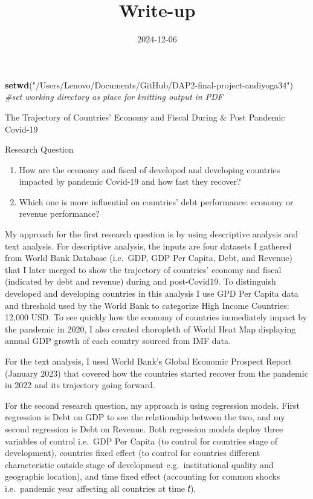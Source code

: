 \documentclass[
]{article}
\title{Write-up}
\author{}
\date{\vspace{-2.5em}2024-12-06}
\newenvironment{Shaded}{\begin{snugshade}}{\end{snugshade}}
\newcommand{\CommentTok}[1]{\textcolor[rgb]{0.56,0.35,0.01}{\textit{#1}}}
\newcommand{\FunctionTok}[1]{\textcolor[rgb]{0.13,0.29,0.53}{\textbf{#1}}}
\newcommand{\NormalTok}[1]{#1}
\newcommand{\StringTok}[1]{\textcolor[rgb]{0.31,0.60,0.02}{#1}}
\begin{document}
\maketitle

\begin{Shaded}
\begin{Highlighting}[]
\FunctionTok{setwd}\NormalTok{(}\StringTok{"/Users/Lenovo/Documents/GitHub/DAP2{-}final{-}project{-}andiyoga34"}\NormalTok{) }\CommentTok{\#set working directory as place for knitting output in PDF}
\end{Highlighting}
\end{Shaded}

The Trajectory of Countries' Economy and Fiscal During \& Post Pandemic
Covid-19

Research Question

\begin{enumerate}
\def\labelenumi{\arabic{enumi}.}
\item
  How are the economy and fiscal of developed and developing countries
  impacted by pandemic Covid-19 and how fast they recover?
\item
  Which one is more influential on countries' debt performance: economy
  or revenue performance?
\end{enumerate}

My approach for the first research question is by using descriptive
analysis and text analysis. For descriptive analysis, the inputs are
four datasets I gathered from World Bank Database (i.e.~GDP, GDP Per
Capita, Debt, and Revenue) that I later merged to show the trajectory of
countries' economy and fiscal (indicated by debt and revenue) during and
post-Covid19. To distinguish developed and developing countries in this
analysis I use GPD Per Capita data and threshold used by the World Bank
to categorize High Income Countries: 12,000 USD. To see quickly how the
economy of countries immediately impact by the pandemic in 2020, I also
created choropleth of World Heat Map displaying annual GDP growth of
each country sourced from IMF data.

For the text analysis, I used World Bank's Global Economic Prospect
Report (January 2023) that covered how the countries started recover
from the pandemic in 2022 and its trajectory going forward.

For the second research question, my approach is using regression
models. First regression is Debt on GDP to see the relationship between
the two, and my second regression is Debt on Revenue. Both regression
models deploy three variables of control i.e.~GDP Per Capita (to control
for countries stage of development), countries fixed effect (to control
for countries different characteristic outside stage of development
e.g.~institutional quality and geographic location), and time fixed
effect (accounting for common shocks i.e.~pandemic year affecting all
countries at time 𝑡).
\end{document}
